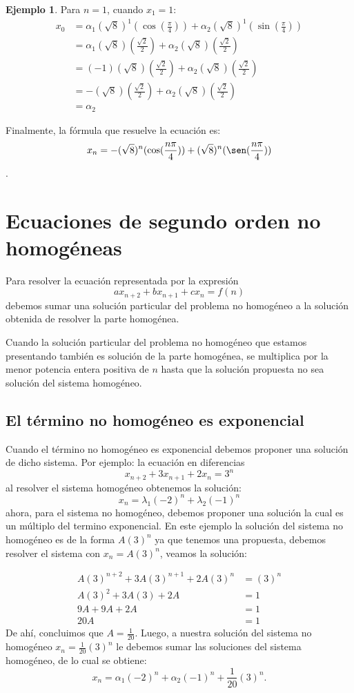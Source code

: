 \documentclass{report}
\theoremstyle{definition}
\newtheorem{ejemplo}[teorema]{Ejemplo}
\begin{document}
\begin{ejemplo}
Para $n=1$, cuando $x_1=1$:
\begin{align*}
  x_0&=\alpha_1(\sqrt{8})^1(\cos(\frac{\pi}{4}))+\alpha_2(\sqrt{8})^1(\sin(\frac{\pi}{4}))\\
  &=\alpha_1(\sqrt{8})(\frac{\sqrt{2}}{2})+\alpha_2(\sqrt{8})(\frac{\sqrt{2}}{2})\\
  &=(-1)(\sqrt{8})(\frac{\sqrt{2}}{2})+\alpha_2(\sqrt{8})(\frac{\sqrt{2}}{2})\\
  &=-(\sqrt{8})(\frac{\sqrt{2}}{2})+\alpha_2(\sqrt{8})(\frac{\sqrt{2}}{2})\\
  &=\alpha_2
\end{align*}

Finalmente, la fórmula que resuelve la ecuación es:
$$x_n=-(\sqrt{8})^n(\cos(\frac{n\pi}{4}))+(\sqrt{8})^n(\sen(\frac{n\pi}{4}))$$.
\end{ejemplo}

\section{Ecuaciones de segundo orden no homogéneas}
\label{sec:nohomogeneas}

Para resolver la ecuación representada por la expresión
$$ax_{n+2}+bx_{n+1}+cx_{n}=f(n)$$
debemos sumar una solución particular del problema no homogéneo a la
solución obtenida de resolver la parte homogénea.

Cuando la solución particular del problema no homogéneo que estamos
presentando también es solución de la parte homogénea, se multiplica
por la menor potencia entera positiva de $n$ hasta que la solución
propuesta no sea solución del sistema homogéneo.

\subsection{El término no homogéneo es exponencial}
\label{sec:exponencial}

Cuando el término no homogéneo es exponencial debemos proponer una
solución de dicho sistema. Por ejemplo: la ecuación en diferencias
$$x_{n+2}+3x_{n+1}+2x_n=3^n$$
al resolver el sistema homogéneo obtenemos la solución:
$$x_n=\lambda_1(-2)^n+\lambda_2(-1)^n$$
ahora, para el sistema no homogéneo, debemos proponer una solución la
cual es un múltiplo del termino exponencial. En este ejemplo la
solución del sistema no homogéneo es de la forma $A(3)^n$ ya que
tenemos una propuesta, debemos resolver el sistema con $x_n=A(3)^n$,
veamos la solución:

\begin{align*}
  A(3)^{n+2}+3A(3)^{n+1}+2A(3)^n&=(3)^n\\
  A(3)^2+3A(3)+2A&=1\\
  9A+9A+2A&=1\\
  20A&=1
\end{align*}
De ahí, concluimos que $A=\frac{1}{20}$.
Luego, a nuestra solución del sistema no homogéneo  $x_n=\frac{1}{20}(3)^n$ le debemos sumar las soluciones del sistema homogéneo, de lo cual se obtiene:
$$x_n=\alpha_1(-2)^n+\alpha_2(-1)^n+\frac{1}{20}(3)^n.$$
\end{document}
